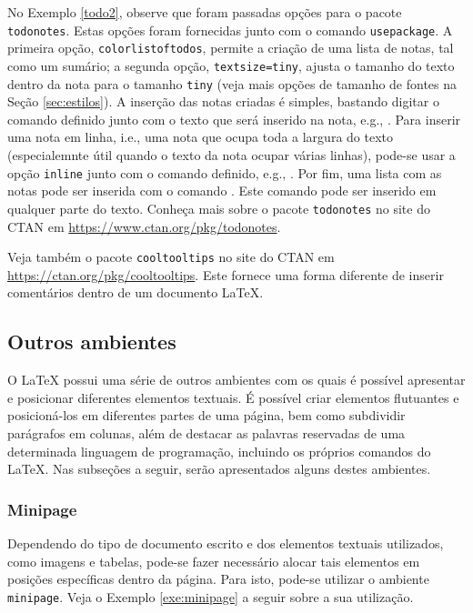 No Exemplo \ref{todo2}, observe que foram passadas opções para o pacote {\tt todonotes}. Estas opções foram fornecidas junto com o comando {\tt usepackage}. A primeira opção, {\tt colorlistoftodos}, permite a criação de uma lista de notas, tal como um sumário; a segunda opção, {\tt textsize=tiny}, ajusta o tamanho do texto dentro da nota para o tamanho {\tt tiny} (veja mais opções de tamanho de fontes na Seção \ref{sec:estilos}). A inserção das notas criadas é simples, bastando digitar o comando definido junto com o texto que será inserido na nota, e.g., \texttt{}. Para inserir uma nota em linha, i.e., uma nota que ocupa toda a largura do texto (especialemnte útil quando o texto da nota ocupar várias linhas), pode-se usar a opção {\tt inline} junto com o comando definido, e.g., \texttt{}. Por fim, uma lista com as notas pode ser inserida com o comando \texttt{}. Este comando pode ser inserido em qualquer parte do texto. Conheça mais sobre o pacote {\tt todonotes} no site do CTAN em \url{https://www.ctan.org/pkg/todonotes}.

\begin{marker}
Veja também o pacote {\tt cooltooltips} no site do CTAN em \url{https://ctan.org/pkg/cooltooltips}. Este fornece uma forma diferente de inserir comentários dentro de um documento \LaTeX{}.
\end{marker}

\subsection{Outros ambientes}
\label{sec:out_ambs}

O \LaTeX{} possui uma série de outros ambientes com os quais é possível apresentar e posicionar diferentes elementos textuais. É possível criar elementos flutuantes e posicioná-los em diferentes partes de uma página, bem como subdividir parágrafos em colunas, além de destacar as palavras reservadas de uma determinada linguagem de programação, incluindo os próprios comandos do \LaTeX{}. Nas subseções a seguir, serão apresentados alguns destes ambientes.

\subsubsection*{Minipage}
\label{sec:minipage}

Dependendo do tipo de documento escrito e dos elementos textuais utilizados, como imagens e tabelas, pode-se fazer necessário alocar tais elementos em posições específicas dentro da página. Para isto, pode-se utilizar o ambiente {\tt minipage}. Veja o Exemplo \ref{exe:minipage} a seguir sobre a sua utilização.

